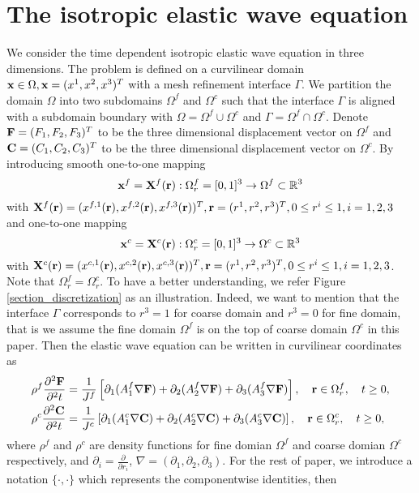 \section{The isotropic elastic wave equation }
We consider the time dependent isotropic elastic wave equation in three dimensions. The problem is defined on a curvilinear domain ${\bf x}\in\Omega, {\bf x} = (x^{1},x^{2},x^{3})^T$ with a mesh refinement interface $\Gamma$.  We partition the domain $\Omega$ into two subdomains $\Omega^f$ and $\Omega^c$ such that the interface $\Gamma$ is aligned with a subdomain boundary with $\Omega = \Omega^f\cup\Omega^c$ and $\Gamma = \Omega^f\cap\Omega^c$. Denote ${\bf F} = (F_1,F_2,F_3)^T$ to be the three dimensional displacement vector on $\Omega^f$ and ${\bf C} = (C_1,C_2,C_3)^T$ to be the three dimensional displacement vector on $\Omega^c$. By introducing smooth one-to-one mapping
\[{\bf x}^{f} = {\bf X}^{f}({\bf r}) : \Omega^f_r = [0,1]^3 \rightarrow \Omega^{f} \subset \mathbb{R}^3 \]
with ${\bf X}^{f}({\bf r}) = (x^{f,1}({\bf r}),x^{f,2}({\bf r}),x^{f,3}({\bf r}))^T, {\bf r} = (r^{1},r^{2},r^{3})^T, 0\leq r^{i}\leq1, i = 1,2,3$
and one-to-one mapping 
\[{\bf x}^{c} = {\bf X}^{c}({\bf r}) : \Omega^c_r = [0,1]^3 \rightarrow \Omega^{c} \subset \mathbb{R}^3\]
 with ${\bf X}^{c}({\bf r}) = (x^{c,1}({\bf r}),x^{c,2}({\bf r}),x^{c,3}({\bf r}))^T, {\bf r} = (r^{1},r^{2},r^{3})^T, 0\leq r^{i}\leq1, i = 1,2,3$. Note that $\Omega^f_r = \Omega^c_r$. To have a better understanding, we refer Figure \ref{section_discretization} as an illustration. Indeed, we want to mention that the interface $\Gamma$ corresponds to $r^3 = 1$ for coarse domain and $r^3 = 0$ for fine domain, that is we assume the fine domain $\Omega^f$ is on the top of coarse domain $\Omega^c$ in this paper. Then the elastic wave equation can be written in curvilinear coordinates as
\begin{align}\label{elastic_curvi}
	\rho^f\frac{\partial^2{\bf F}}{\partial^2 t} &= \frac{1}{J^f}\left[\partial_1(A_1^f\nabla{\bf F}) + \partial_2(A_2^f\nabla{\bf F}) +\partial_3(A_3^f\nabla{\bf F}) \right], \ \ \  {\bf r}\in\Omega^f_r,\ \ \  t\geq0,\nonumber\\
	\rho^c\frac{\partial^2{\bf C}}{\partial^2 t} &= \frac{1}{J^c}\left[\partial_1(A_1^c\nabla{\bf C}) + \partial_2(A_2^c\nabla{\bf C}) +\partial_3(A_3^c\nabla{\bf C}) \right],\ \ \  {\bf r}\in\Omega^c_r,\ \ \  t\geq0,
\end{align}
where $\rho^f$ and $\rho^c$ are density functions for fine domian $\Omega^f$ and coarse domian $\Omega^c$ respectively, and $\partial_i = \frac{\partial}{\partial r_i}$, $\nabla = (\partial_1,\partial_2,\partial_3)$. For the rest of paper, we introduce a notation $\{\cdot,\cdot\}$ which represents the componentwise identities, then
